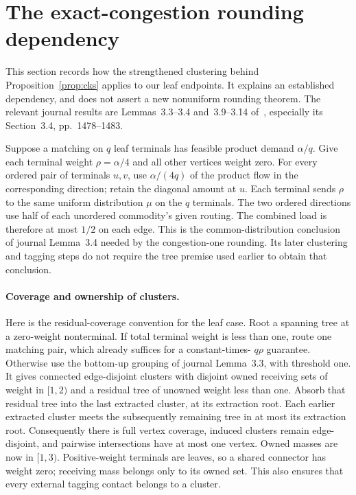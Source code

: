 \documentclass[acmsmall,11pt,screen,nonacm]{acmart}
\begin{document}
\section{The exact-congestion rounding dependency}\label{sec:correction}

This section records how the strengthened clustering behind
Proposition~\ref{prop:cks} applies to our leaf endpoints. It explains an
established dependency, and does not assert a new nonuniform rounding theorem.
The relevant journal results are Lemmas~3.3--3.4 and~3.9--3.14
of~\cite{CKS13}, especially its Section~3.4, pp.~1478--1483.

Suppose a matching on $q$ leaf terminals has feasible product demand
$\alpha/q$. Give each terminal weight $\rho=\alpha/4$ and all other
vertices weight zero. For every ordered pair of terminals $u,v$, use
$\alpha/(4q)$ of the product flow in the corresponding direction; retain
the diagonal amount at $u$. Each terminal sends $\rho$ to the same uniform
distribution $\mu$ on the $q$ terminals. The two ordered directions use
half of each unordered commodity's given routing. The combined load is
therefore at most $1/2$ on each edge. This is the common-distribution
conclusion of journal Lemma~3.4 needed by the congestion-one rounding.
Its later clustering and tagging steps do not require the tree premise
used earlier to obtain that conclusion.

\paragraph{Coverage and ownership of clusters.}
Here is the residual-coverage convention for the leaf case. Root a spanning
tree at a zero-weight nonterminal. If total terminal weight is less than
one, route one matching pair, which already suffices for a constant-times-
$q\rho$ guarantee. Otherwise use the bottom-up grouping of journal
Lemma~3.3, with threshold one. It gives connected edge-disjoint clusters
with disjoint owned receiving sets of weight in $[1,2)$ and a residual
tree of unowned weight less than one. Absorb that residual tree into the
last extracted cluster, at its extraction root. Each earlier extracted
cluster meets the subsequently remaining tree in at most its extraction
root. Consequently there is full vertex coverage, induced clusters
remain edge-disjoint, and pairwise intersections have at most one vertex.
Owned masses are now in $[1,3)$. Positive-weight terminals are leaves,
so a shared connector has weight zero; receiving mass belongs only to
its owned set. This also ensures that every external tagging contact
belongs to a cluster.
\end{document}
